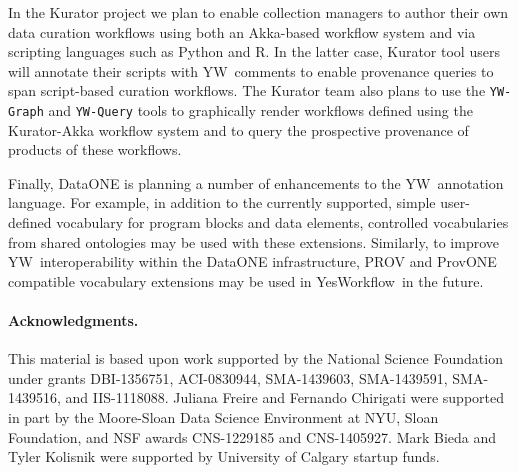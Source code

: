 \documentclass{article}
\newcommand{\YW}{\textsf{YesWorkflow}}
\newcommand{\yw}{\textsf{YW}}
\newcommand{\ywm}[1]{\texttt{#1}}
\newcommand{\R}{\textsf{R}}
\begin{document}
In the Kurator project \cite{kuratorproject} we plan to enable
collection managers to author their own data curation workflows using
both an Akka-based workflow system and via scripting languages such as
Python and \R. In the latter case, Kurator tool users will annotate
their scripts with \yw\ comments to enable provenance queries to span
script-based curation workflows.
The Kurator team also plans to use the \ywm{YW-Graph} and
\ywm{YW-Query} tools to graphically render workflows defined using the
Kurator-Akka workflow system and to query the prospective provenance
of products of these workflows.

Finally, DataONE is planning a number of enhancements to the \yw\
annotation language. For example, in addition to the currently
supported, simple user-defined vocabulary for program blocks and data
elements, controlled vocabularies from shared ontologies may be used
with these extensions. Similarly, to improve \yw\ interoperability
within the DataONE infrastructure, PROV \cite{moreau2013prov} and
ProvONE \cite{dataone2014provone} compatible vocabulary extensions
may be used in \YW\ in the future.

\paragraph{Acknowledgments.} This material is based upon work
supported by the National Science Foundation under grants DBI-1356751,
ACI-0830944, SMA-1439603, SMA-1439591, SMA-1439516, and IIS-1118088.  Juliana Freire and 
Fernando Chirigati were supported in part by the Moore-Sloan Data 
Science Environment at NYU, Sloan Foundation, and NSF awards 
CNS-1229185 and CNS-1405927. Mark Bieda and Tyler Kolisnik were 
supported by University of Calgary startup funds.

\small



\end{document}
